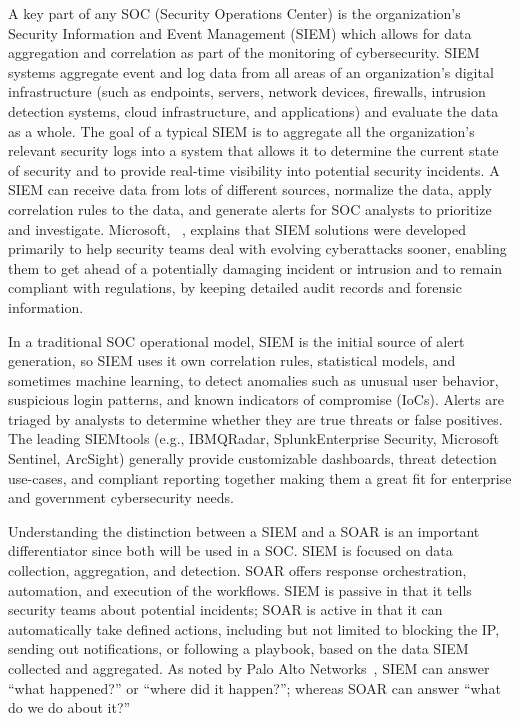 A key part of any SOC (Security Operations Center) is the organization’s Security Information and Event Management (SIEM) which allows for data aggregation and correlation as part of the monitoring of cybersecurity. SIEM systems aggregate event and log data from all areas of an organization’s digital infrastructure (such as endpoints, servers, network devices, firewalls, intrusion detection systems, cloud infrastructure, and applications) and evaluate the data as a whole. The goal of a typical SIEM is to aggregate all the organization's relevant security logs into a system that allows it to determine the current state of security and to provide real-time visibility into potential security incidents. A SIEM can receive data from lots of different sources, normalize the data, apply correlation rules to the data, and generate alerts for SOC analysts to prioritize and investigate. Microsoft, ~\cite{microsoftsiem}, explains that SIEM solutions were developed primarily to help security teams deal with evolving cyberattacks sooner, enabling them to get ahead of a potentially damaging incident or intrusion and to remain compliant with regulations, by keeping detailed audit records and forensic information.

In a traditional SOC operational model, SIEM is the initial source of alert generation, so SIEM uses it own correlation rules, statistical models, and sometimes machine learning, to detect anomalies such as unusual user behavior, suspicious login patterns, and known indicators of compromise (IoCs). Alerts are triaged by analysts to determine whether they are true threats or false positives.  The leading SIEMtools (e.g., IBMQRadar, SplunkEnterprise Security, Microsoft Sentinel, ArcSight) generally provide customizable dashboards, threat detection use-cases, and compliant reporting together making them a great fit for enterprise and government cybersecurity needs.

Understanding the distinction between a SIEM and a SOAR is an important differentiator since both will be used in a SOC. SIEM is focused on data collection, aggregation, and detection. SOAR offers response orchestration, automation, and execution of the workflows. SIEM is passive in that it tells security teams about potential incidents; SOAR is active in that it can automatically take defined actions, including but not limited to blocking the IP, sending out notifications, or following a playbook, based on the data SIEM collected and aggregated. As noted by Palo Alto Networks~\cite{paloalto}, SIEM can answer “what happened?” or “where did it happen?”; whereas SOAR can answer “what do we do about it?”

